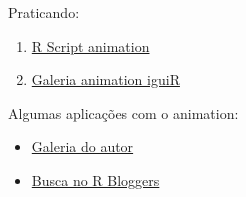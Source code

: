\begin{frame}

  Praticando:
  \begin{enumerate}
  \item \href{run:./R/animation/animation.R}{R Script animation}
  \item \href{run:./animation/animation.html}{Galeria animation iguiR}
  \end{enumerate}
  
  \vspace{0.5cm}
  Algumas aplicações com o animation:
  \begin{itemize}
  \item \href{http://vis.supstat.com/categories.html\#animation-ref}{Galeria
      do autor}
  \item \href{http://www.r-bloggers.com/?s=animation}{Busca no R
      Bloggers}
  \end{itemize}

\end{frame}
